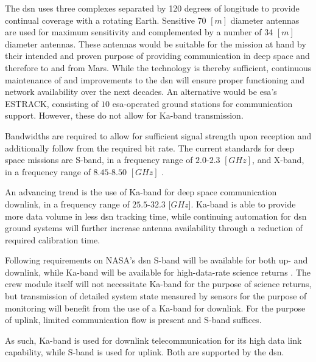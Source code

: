 The \gls{dsn} uses three complexes separated by 120 degrees of longitude to provide continual coverage with a rotating Earth. Sensitive 70 $[m]$ diameter antennas are used for maximum sensitivity and complemented by a number of 34 $[m]$ diameter antennas\cite{Wertz2011}. These antennas would be suitable for the mission at hand by their intended and proven purpose of providing communication in deep space and therefore to and from Mars. While the technology is thereby sufficient, continuous maintenance of and improvements to the \gls{dsn} will ensure proper functioning and network availability over the next decades. An alternative would be \gls{esa}'s ESTRACK, consisting of $10$ \gls{esa}-operated ground stations for communication support. However, these do not allow for Ka-band transmission\cite{Wertz2011}.

Bandwidths are required to allow for sufficient signal strength upon reception and additionally follow from the required bit rate. The current standards for deep space missions are S-band, in a frequency range of $2.0$-$2.3$ $[GHz]$, and X-band, in a frequency range of $8.45$-$8.50$ $[GHz]$ \cite{Wertz2011}.

An advancing trend is the use of Ka-band for deep space communication downlink, in a frequency range of $25.5$-$32.3$ [$GHz$]. Ka-band is able to provide more data volume in less \gls{dsn} tracking time, while continuing automation for \gls{dsn} ground systems will further increase antenna availability through a reduction of required calibration time\cite{Edwards1999}. 

Following requirements on NASA's \gls{dsn} S-band will be available for both up- and downlink, while Ka-band will be available for high-data-rate science returns \cite{Labelle2012}. The crew module itself will not necessitate Ka-band for the purpose of science returns, but transmission of detailed system state measured by sensors for the purpose of monitoring will benefit from the use of a Ka-band for downlink. For the purpose of uplink, limited communication flow is present and S-band suffices.%

As such, Ka-band is used for downlink telecommunication for its high data link capability, while S-band is used for uplink. Both are supported by the \gls{dsn}.